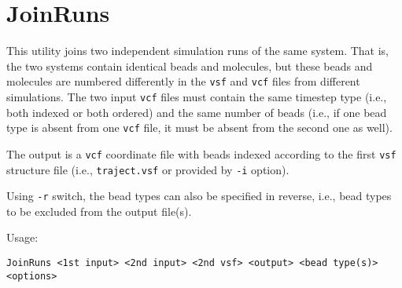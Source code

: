 \section{JoinRuns} \label{sec:JoinRuns}

This utility joins two independent simulation runs of the same system.
That is, the two systems contain identical beads and molecules, but these
beads and molecules are numbered differently in the \texttt{vsf} and
\texttt{vcf} files from different simulations. The two input \texttt{vcf}
files must contain the same timestep type (i.e., both indexed or both
ordered) and the same number of beads (i.e., if one bead type is absent
from one \texttt{vcf} file, it must be absent from the second one as well).

The output is a \texttt{vcf} coordinate file with beads indexed according
to the first \texttt{vsf} structure file (i.e., \texttt{traject.vsf} or
provided by \texttt{-i} option).

Using \texttt{-r} switch, the bead types can also be specified in reverse,
i.e., bead types to be excluded from the output file(s).

Usage:

\vspace{1em}
\noindent
\texttt{JoinRuns <1st input> <2nd input> <2nd vsf> <output> <bead type(s)> \\ <options>}

